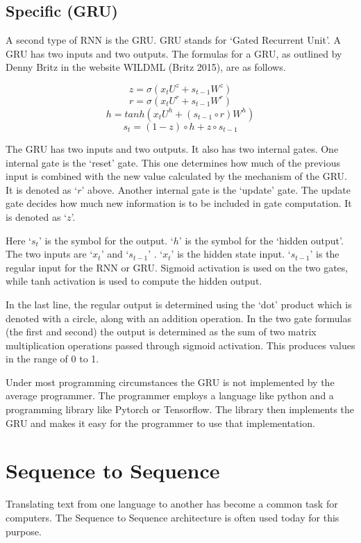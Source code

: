 \subsection*{Specific (GRU)}
A second type of RNN is the \ac{GRU}. GRU stands for `Gated Recurrent Unit'. A GRU has two inputs and two outputs. The formulas for a GRU, as outlined by Denny Britz in the website WILDML (Britz 2015)\cite{2015Britz}, are as follows.


$$ z =\sigma(x_tU^z + s_{t-1} W^z) $$  
$$ r =\sigma(x_t U^r +s_{t-1} W^r) $$  
$$ h = tanh(x_t U^h + (s_{t-1} \circ r) W^h) $$  
$$ s_t = (1 - z) \circ h + z \circ s_{t-1} $$  


The GRU has two inputs and two outputs. It also has two internal gates. One internal gate is the `reset' gate. This one determines how much of the previous input is combined with the new value calculated by the mechanism of the GRU. It is denoted as `$r$' above. Another internal gate is the `update' gate. The update gate decides how much new information is to be included in gate computation. It is denoted as `$z$'.

Here `$ s_t $' is the symbol for the output. `$h$' is the symbol for the `hidden output'. The two inputs are `$ x_t $' and `$ s_{t-1} $' . `$ x_t $' is the hidden state input. `$ s_{t-1} $' is the regular input for the RNN or GRU. Sigmoid activation is used on the two gates, while tanh activation is used to compute the hidden output.

In the last line, the regular output is determined using the `dot' product which is denoted with a circle, along with an addition operation. In the two gate formulas (the first and second) the output is determined as the sum of two matrix multiplication operations passed through sigmoid activation. This produces values in the range of 0 to 1.

Under most programming circumstances the GRU is not implemented by the average programmer. The programmer employs a language like python and a programming library like Pytorch or Tensorflow. The library then implements the GRU and makes it easy for the programmer to use that implementation.

\section{Sequence to Sequence}

Translating text from one language to another has become a common task for computers. The Sequence to Sequence architecture is often used today  for this purpose.

